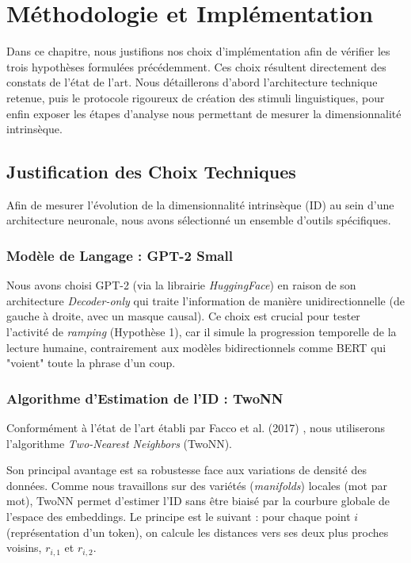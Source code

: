 \chapter{Méthodologie et Implémentation}
\label{chap:methode}

Dans ce chapitre, nous justifions nos choix d'implémentation afin de vérifier les trois hypothèses formulées précédemment. Ces choix résultent directement des constats de l'état de l'art. Nous détaillerons d'abord l'architecture technique retenue, puis le protocole rigoureux de création des stimuli linguistiques, pour enfin exposer les étapes d'analyse nous permettant de mesurer la dimensionnalité intrinsèque.

\section{Justification des Choix Techniques}

Afin de mesurer l'évolution de la dimensionnalité intrinsèque (ID) au sein d'une architecture neuronale, nous avons sélectionné un ensemble d'outils spécifiques.

\subsection{Modèle de Langage : GPT-2 Small}
Nous avons choisi GPT-2 (via la librairie \textit{HuggingFace}) en raison de son architecture \textit{Decoder-only} qui traite l'information de manière unidirectionnelle (de gauche à droite, avec un masque causal). Ce choix est crucial pour tester l'activité de \textit{ramping} (Hypothèse 1), car il simule la progression temporelle de la lecture humaine, contrairement aux modèles bidirectionnels comme BERT qui "voient" toute la phrase d'un coup.

\subsection{Algorithme d'Estimation de l'ID : TwoNN}
Conformément à l'état de l'art établi par Facco et al. (2017) \cite{facco2017estimating}, nous utiliserons l'algorithme \textit{Two-Nearest Neighbors} (TwoNN). 

Son principal avantage est sa robustesse face aux variations de densité des données. Comme nous travaillons sur des variétés (\textit{manifolds}) locales (mot par mot), TwoNN permet d'estimer l'ID sans être biaisé par la courbure globale de l'espace des embeddings.
Le principe est le suivant : pour chaque point $i$ (représentation d'un token), on calcule les distances vers ses deux plus proches voisins, $r_{i,1}$ et $r_{i,2}$.

